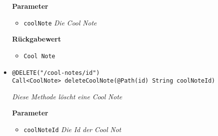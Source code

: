 \begin{itemize}
		\textbf{Parameter} 
			\begin{itemize}
				\item\texttt{coolNote}
		 		\textit{Die Cool Note}
	 		\end{itemize}

		\textbf{Rückgabewert} 
		\begin{itemize}
				\item\texttt{Cool Note}
	 		\end{itemize}

      \item\texttt{{@DELETE("/cool-notes/{id}")\\ Call<CoolNote> deleteCoolNote(@Path(\grqq id\grqq) String coolNoteId)}}

		\textit{Diese Methode löscht eine Cool Note }

	\textbf{Parameter} 
			\begin{itemize}
				\item\texttt{coolNoteId}
		 		\textit{Die Id der Cool Not}
	 		\end{itemize}

	 \end{itemize}


